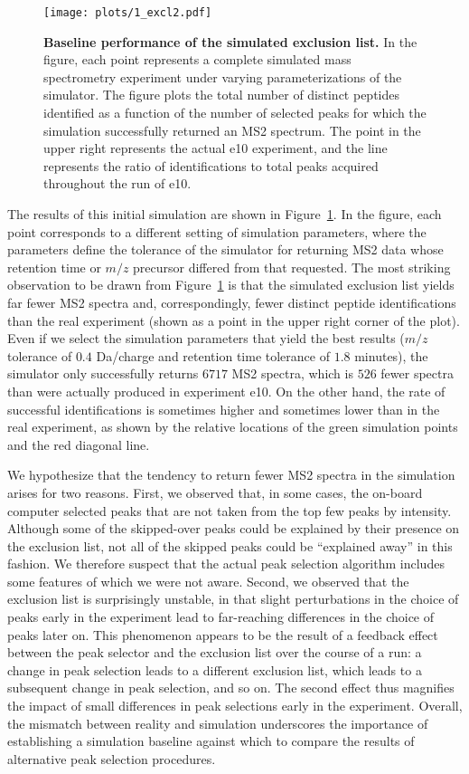 \documentclass[12pt]{article}
\begin{document}
\begin{figure}
\centering
\texttt{[image: plots/1\_excl2.pdf]}
\caption{{\bf Baseline performance of the simulated exclusion list.}
  In the figure, each point represents a complete simulated mass
  spectrometry experiment under varying parameterizations of the
  simulator. The figure plots the total number of distinct peptides
  identified as a function of the number of selected peaks for which
  the simulation successfully returned an MS2 spectrum. The point in
  the upper right represents the actual e10 experiment, and the line
  represents the ratio of identifications to total peaks acquired
  throughout the run of e10.
  \label{figure:baseline}}
\end{figure}

The results of this initial simulation are shown in
Figure~\ref{figure:baseline}.  In the figure, each point corresponds
to a different setting of simulation parameters, where the parameters
define the tolerance of the simulator for returning MS2 data whose
retention time or $m/z$ precursor differed from that requested.  The
most striking observation to be drawn from
Figure~\ref{figure:baseline} is that the simulated exclusion list
yields far fewer MS2 spectra and, correspondingly, fewer distinct
peptide identifications than the real experiment (shown as a point in
the upper right corner of the plot).  Even if we select the simulation
parameters that yield the best results ($m/z$ tolerance of $0.4$
Da/charge and retention time tolerance of $1.8$ minutes), the
simulator only successfully returns $6717$ MS2 spectra, which is $526$
fewer spectra than were actually produced in experiment e10.  On the
other hand, the rate of successful identifications is sometimes higher
and sometimes lower than in the real experiment, as shown by the
relative locations of the green simulation points and the red diagonal
line.

We hypothesize that the tendency to return fewer MS2 spectra in the simulation arises for two reasons.  First, we observed that, in some cases, the on-board computer selected peaks that are not taken from the top few peaks
by intensity. Although some of the skipped-over peaks could be explained by their presence on the exclusion list, not all of the skipped peaks could be ``explained away'' in this fashion.  We therefore suspect that the
actual peak selection algorithm includes some features of which
we were not aware. Second, we observed that the exclusion list is surprisingly
unstable, in that slight perturbations in the choice of peaks early in the
experiment lead to far-reaching differences in the choice of peaks later
on. This phenomenon appears to be the result of a feedback effect between the
peak selector and the exclusion list over the course of a run: a change in peak selection leads to a different exclusion list, which leads to a subsequent change in peak selection, and so on. The second effect thus magnifies the impact of small differences in peak selections early in the experiment.  Overall, the mismatch between reality and simulation underscores the importance of establishing a simulation baseline against which to compare the results of alternative peak selection procedures.
\end{document}
